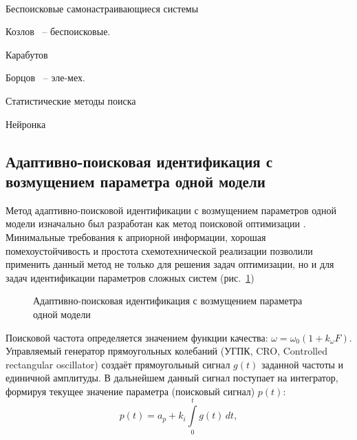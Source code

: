 ~\cite{medved_nepar_alg_id_nds}



Беспоисковые самонастраивающиеся системы~\cite{kozlov_nosearch_sns}

Козлов~\cite{kozlov_nosearch_sns} -- беспоисковые.

Карабутов~\cite{karabutov_adapt_id_sys,saliga_id_ctl_black}

Борцов~\cite{borcov} -- эле-мех.

Статистические методы поиска~\cite{rastr_stat_meth_search}

Нейронка~\cite{chen_nn_for_nls_mod,chen_nls_id_radial_basis,patra_nds_id_cheb,narendra_id_ctl_ds_nn,bodyan_adapt_viyavl}


\subsection{Адаптивно-поисковая идентификация с возмущением параметра одной модели} %

Метод адаптивно-поисковой идентификации с возмущением параметров одной модели
изначально был разработан как метод поисковой оптимизации
\cite{mich_92,ivah_int_meth_direct,mai_adopt_meth_direct,rastr_seu,kras_dyn_nsn,mai_iss_adop_alg_etalon,rastr_seu}.
Минимальные требования к априорной информации, хорошая помехоустойчивость и
простота схемотехнической реализации позволили применить данный метод не только
для решения задач оптимизации, но и для задач идентификации параметров сложных
систем
(рис.~\ref{atu:f:apid1})

\begin{figure}[htb!]
\begin{center}

\end{center}
\caption{Адаптивно-поисковая идентификация с возмущением параметра одной модели}
\label{atu:f:apid1}
\end{figure}

Поисковой частота определяется
значением функции качества:
\( \omega = \omega_0 ( 1 + k_\omega F ) \).
Управляемый генератор прямоугольных колебаний (УГПК, CRO, Controlled rectangular oscillator)
создаёт прямоугольный сигнал \( g(t) \)
заданной частоты и единичной амплитуды.
В дальнейшем данный сигнал поступает на интегратор,
формируя текущее значение параметра (поисковый сигнал) \( p(t) \):
%
\begin{equation}
 p(t) = a_p + k_i \int\limits_{0}^{t} g(t) \, dt ,
\label{atu:eq:api_integr}
\end{equation}

